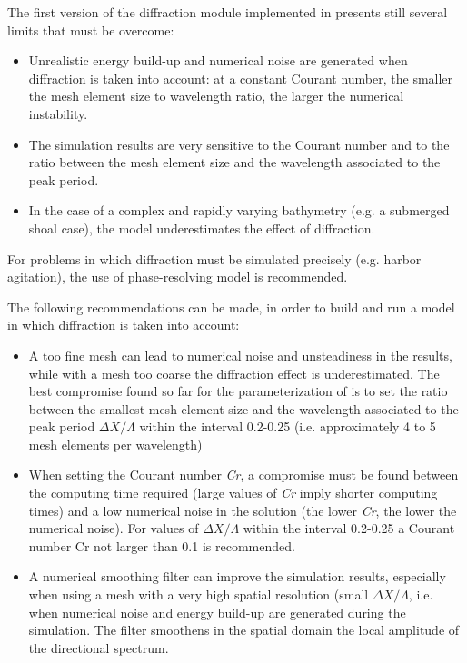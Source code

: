  The first version of the diffraction module implemented in \tomawac presents still several limits that must be overcome:

\begin{itemize}
\item  Unrealistic energy build-up and numerical noise are generated when diffraction is taken into account: at a constant Courant number, the smaller the mesh element size to wavelength ratio, the larger the numerical instability.

\item  The simulation results are very sensitive to the Courant number and to the ratio between the mesh element size and the wavelength associated to the peak period.

\item  In the case of a complex and rapidly varying bathymetry (e.g. a submerged shoal case), the model underestimates the effect of diffraction.
\end{itemize}

 For problems in which diffraction must be simulated precisely (e.g. harbor agitation), the use of phase-resolving model is recommended.

 The following recommendations can be made, in order to build and run a \tomawac model in which diffraction is taken into account:

\begin{itemize}
\item  A too fine mesh can lead to numerical noise and unsteadiness in the results, while with a mesh too coarse the diffraction effect is underestimated. The best compromise found so far for the parameterization of \tomawac is to set the ratio between the smallest mesh element size and the wavelength associated to the peak period $\Delta X/\Lambda$ within the interval 0.2-0.25 (i.e. approximately 4 to 5 mesh elements per wavelength)

\item  When setting the Courant number \textit{Cr}, a compromise must be found between the computing time required (large values of \textit{Cr} imply shorter computing times) and a low numerical noise in the solution (the lower \textit{Cr}, the lower the numerical noise). For values of  $\Delta X/\Lambda$ within the interval 0.2-0.25 a Courant number Cr not larger than 0.1 is recommended.

\item  A numerical smoothing filter can improve the simulation results, especially when using a mesh with a very high spatial resolution (small $\Delta X/\Lambda$, i.e. when numerical noise and energy build-up are generated during the simulation. The filter smoothens in the spatial domain the local amplitude of the directional spectrum.
\end{itemize}


